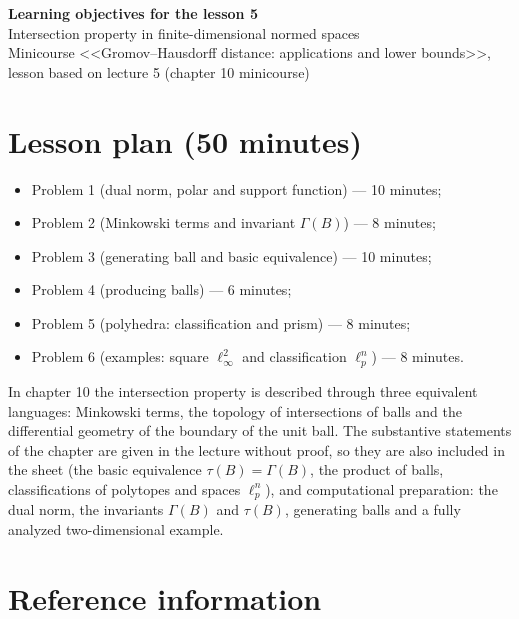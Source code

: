 \documentclass[a4paper,12pt]{report}
\begin{document}
\begin{center}
{\Large\bfseries Learning objectives for the lesson \textup{5}}\\[2mm]
{\large Intersection property in finite-dimensional normed spaces}\\[2mm]
{\small Minicourse <<Gromov--Hausdorff distance: applications and lower bounds>>, lesson based on lecture \textup{5} (chapter \textup{10} minicourse)}
\end{center}

\section*{Lesson plan (\textup{50} minutes)}

\begin{itemize}[leftmargin=*]
\item Problem \textup{1} (dual norm, polar and support function) --- \textup{10} minutes\textup{;}
\item Problem \textup{2} (Minkowski terms and invariant $\Gamma(B)$) --- \textup{8} minutes\textup{;}
\item Problem \textup{3} (generating ball and basic equivalence) --- \textup{10} minutes\textup{;}
\item Problem \textup{4} (producing balls) --- \textup{6} minutes\textup{;}
\item Problem \textup{5} (polyhedra: classification and prism) --- \textup{8} minutes\textup{;}
\item Problem \textup{6} (examples: square $\ell_\infty^2$ and classification $\ell_p^n$) --- \textup{8} minutes.
\end{itemize}

In chapter \textup{10} the intersection property is described through three equivalent languages\textup{:} Minkowski terms, the topology of intersections of balls and the differential geometry of the boundary of the unit ball. The substantive statements of the chapter are given in the lecture without proof, so they are also included in the sheet (the basic equivalence $\tau(B)=\Gamma(B)$, the product of balls, classifications of polytopes and spaces $\ell_p^n$), and computational preparation\textup{:} the dual norm, the invariants $\Gamma(B)$ and $\tau(B)$, generating balls and a fully analyzed two-dimensional example.

\section*{Reference information}
\end{document}
